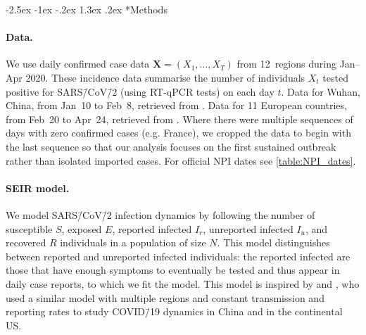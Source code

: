 \documentclass[12pt]{extarticle}
\makeatletter
\renewcommand\section{\@startsection {section}{1}{\z@}%
     {-2.5ex \@plus -1ex \@minus -.2ex}%
     {1.3ex \@plus.2ex}%
    {\Large\bfseries}}
\newcommand{\covid}{COVID\=/19 }
\newcommand{\sars}{SARS\=/CoV\=/2 }
\let\vec\mathbf
\makeatother
\begin{document}
\section*{Methods}



\paragraph*{Data.} 
We use daily confirmed case data $\vec{X}=(X_1, \ldots, X_T)$ from 12~regions during Jan--Apr 2020. These incidence data summarise the number of individuals $X_t$ tested positive for \sars (using RT-qPCR tests) on each day $t$. 
Data for Wuhan, China, from Jan~10 to Feb~8, retrieved from \citet{Pei2020}. Data for 11 European countries, from Feb~20 to Apr~24, retrieved from \citet{Flaxman2020}.
Where there were multiple sequences of days with zero confirmed cases (e.g. France), we cropped the data to begin with the last sequence so that our analysis focuses on the first sustained outbreak rather than isolated imported cases. 
For official NPI dates see \autoref{table:NPI_dates}.



\paragraph*{SEIR model.} \label{sec:model}
We model \sars infection dynamics by following the number of susceptible $S$, exposed $E$, reported infected $I_r$, unreported infected $I_u$, and recovered $R$ individuals in a population of size $N$.
This model distinguishes between reported and unreported infected individuals: the reported infected are those that have enough symptoms to eventually be tested and thus appear in daily case reports, to which we fit the model.
This model is inspired by \citet{Li2020} and \citet{Pei2020}, who used a similar model with multiple regions and constant transmission and reporting rates to study \covid dynamics in China and in the continental US.
\end{document}
